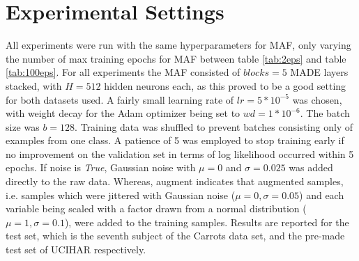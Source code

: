 \documentclass{article}
\begin{document}
\section{Experimental Settings}
All experiments were run with the same hyperparameters for MAF, only varying the number of max training epochs for MAF between table \ref{tab:2eps} and table \ref{tab:100eps}. For all experiments the MAF consisted of $blocks=5$ MADE layers stacked, with $H=512$ hidden neurons each, as this proved to be a good setting for both datasets used. A fairly small learning rate of $lr=5*10^{-5}$ was chosen, with weight decay for the Adam optimizer being set to $wd=1*10^{-6}$. The batch size was $b=128$. Training data was shuffled to prevent batches consisting only of examples from one class. A patience of 5 was employed to stop training early if no improvement on the validation set in terms of log likelihood occurred within 5 epochs. If noise is \emph{True}, Gaussian noise with $\mu = 0$ and $\sigma = 0.025$ was added directly to the raw data. Whereas, augment indicates that augmented samples, i.e. samples which were jittered with Gaussian noise ($\mu =0, \sigma=0.05$) and each variable being scaled with a factor drawn from a normal distribution ($\mu=1, \sigma=0.1$), were added to the training samples. Results are reported for the test set, which is the seventh subject of the Carrots data set, and the pre-made test set of UCIHAR respectively.

\pagebreak
\end{document}

